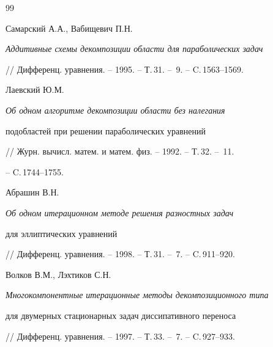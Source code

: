 \begin{thebibliography}{99}


Самарский А.А., Вабищевич П.Н.


{\it Аддитивные схемы декомпозиции области для параболических задач}


// Дифференц. уравнения. -- 1995. -- Т.\,31. -- \No\,9. -- C.\,1563--1569.




Лаевский Ю.М.


{\it Об одном алгоритме декомпозиции области без налегания


подобластей при решении параболических уравнений}


// Журн. вычисл. матем. и матем. физ. -- 1992. -- Т.\,32. -- \No\,11.


-- C.\,1744--1755.




Абрашин В.Н.


{\it Об одном итерационном методе решения разностных задач


для эллиптических уравнений}


// Дифференц. уравнения. -- 1998. -- Т.\,31. -- \No\,7. -- C.\,911--920.




Волков В.М., Лэхтиков С.Н.


{\it Многокомпонентные итерационные методы декомпозиционного типа


для двумерных стационарных задач диссипативного переноса}


// Дифференц. уравнения. -- 1997. -- Т.\,33. -- \No\,7. -- C.\,927--933.





\end{thebibliography}





\vskip 2cm














\label{end}











